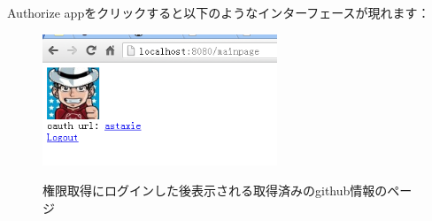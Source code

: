 Authorize appをクリックすると以下のようなインターフェースが現れます：

\begin{figure}[H]
   \includegraphics[width=7cm]{14.4.github3.png}
   \label{図14.6}
   \caption{権限取得にログインした後表示される取得済みのgithub情報のページ}
\end{figure}



